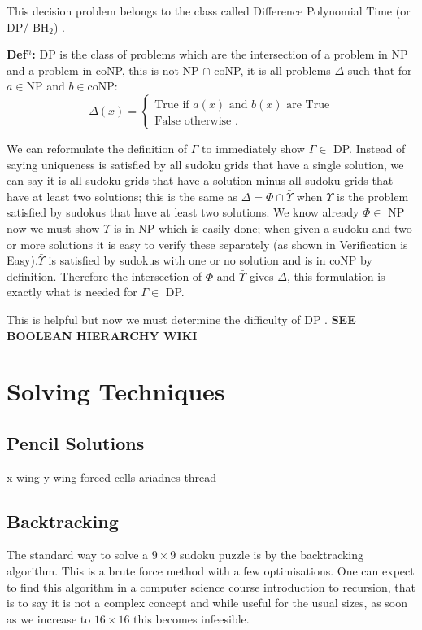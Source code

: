\documentclass[a4paper,11pt]{report}
\begin{document}
This decision problem belongs to the class called Difference Polynomial Time (or DP/ BH$_2$) \cite{dpcomplexity}.

\textbf{Def$^n$:} DP is the class of problems which are the intersection of a problem in NP and a problem in coNP, this is not NP $\cap$ coNP, it is all problems $\Delta$ such that for $a \in $NP and $b\in $coNP:
		\begin{equation}
		        \Delta (x) = \begin{cases}
		            \text{True if $a(x)$ and $b(x)$ are True} \\
		            \text{False otherwise }.
				\end{cases}
		\end{equation}

We can reformulate the definition of $\Gamma$ to immediately show $\Gamma\in$ DP. Instead of saying uniqueness is satisfied by all sudoku grids that have a single solution, we can say it is all sudoku grids that have a solution minus all sudoku grids that have at least two solutions; this is the same as $\Delta = \Phi \cap \bar{\Upsilon}$ when $\Upsilon$ is the problem satisfied by sudokus that have at least two solutions. We know already $\Phi\in$ NP now we must show $\Upsilon$ is in NP which is easily done; when given a sudoku and two or more solutions it is easy to verify these separately (as shown in Verification is Easy).$\bar{\Upsilon}$ is satisfied by sudokus with one or no solution and is in coNP by definition. Therefore the intersection of $\Phi$ and $\bar{\Upsilon}$ gives $\Delta$, this formulation is exactly what is needed for $\Gamma\in$ DP.

This is helpful but now we must determine the difficulty of DP \cite{dphardness}. \textbf{SEE BOOLEAN HIERARCHY WIKI}
		

\chapter{Solving Techniques}
\section{Pencil Solutions}
x wing
y wing
forced
cells
ariadnes thread

\section{Backtracking}
The standard way to solve a $9 \times 9$ sudoku puzzle is by the backtracking algorithm. This is a brute force method with a few optimisations. One can expect to find this algorithm in a computer science course introduction to recursion, that is to say
it is not a complex concept and while useful for the usual sizes, as soon as we increase to $16 \times 16$ this becomes infeesible.
\end{document}

